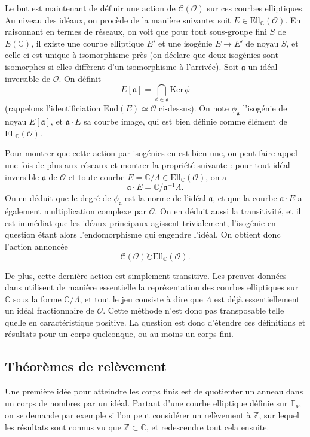 \documentclass[11pt,a4paper]{article}
\newcommand{\Z}{\mathbb{Z}}
\newcommand{\C}{\mathbb{C}}
\newcommand{\F}{\mathbb{F}}
\renewcommand{\O}{\mathcal{O}}
\newcommand{\Cl}{\mathcal{C}}
\newcommand{\vers}{\longrightarrow}
\newcommand{\End}{\mathrm{End}}
\newcommand{\Ell}{\mathrm{Ell}}
\renewcommand{\frak}{\mathfrak}
\renewcommand{\v}{\vspace{5mm}}
\theoremstyle{definition}
\begin{document}
Le but est maintenant de définir une action de $\Cl(\O)$ sur ces courbes elliptiques. Au niveau des idéaux, on procède de la manière suivante: soit $E\in \Ell_\C(\O)$. En raisonnant en termes de réseaux, on voit que pour tout sous-groupe fini $S$ de $E(\C)$, il existe une courbe elliptique $E'$ et une isogénie $E\vers E'$ de noyau $S$, et celle-ci est unique à isomorphisme près (on déclare que deux isogénies sont isomorphes si elles diffèrent d'un isomorphisme à l'arrivée). Soit $\frak a$ un idéal inversible de $\O$. On définit
$$E[\frak a]=\bigcap_{\phi\in \frak a} \mathrm{Ker}\,\phi$$
(rappelons l'identificiation $\End(E)\simeq\O$ ci-dessus). On note $\phi_{\frak a}$ l'isogénie de noyau $E[\frak a]$, et $\frak a\cdot E$ sa courbe image, qui est bien définie comme élément de $\Ell_\C(\O)$.

\v

Pour montrer que cette action par isogénies en est bien une, on peut faire appel une fois de plus aux réseaux et montrer la propriété suivante : pour tout idéal inversible $\frak a$ de $\O$ et toute courbe $E=\C/\Lambda\in \Ell_\C(\O)$, on a
$$\frak a\cdot E = \C/\frak a^{-1} \Lambda.$$
On en déduit que le degré de $\phi_{\frak a}$ est la norme de l'idéal $\frak a$, et que la courbe $\frak a\cdot E$ a également multiplication complexe par $\O$. On en déduit aussi la transitivité, et il est immédiat que les idéaux principaux agissent trivialement, l'isogénie en question étant alors l'endomorphisme qui engendre l'idéal. On obtient donc l'action annoncée
$$\Cl(\O) \circlearrowright \Ell_\C(\O).$$

De plus, cette dernière action est simplement transitive. Les preuves données dans \cite{Sil2} utilisent de manière essentielle la représentation des courbes elliptiques sur $\C$ sous la forme $\C/\Lambda$, et tout le jeu consiste à dire que $\Lambda$ est déjà essentiellement un idéal fractionnaire de $\O$. Cette méthode n'est donc pas transposable telle quelle en caractéristique positive. La question est donc d'étendre ces définitions et résultats pour un corps quelconque, ou au moins un corps fini.

\subsection{Théorèmes de relèvement}

Une première idée pour atteindre les corps finis est de quotienter un anneau dans un corps de nombres par un idéal. Partant d'une courbe elliptique définie sur $\F_p$, on se demande par exemple si l'on peut considérer un relèvement à $\Z$, sur lequel les résultats sont connus vu que $\Z\subset\C$, et redescendre tout cela ensuite. 
\end{document}

